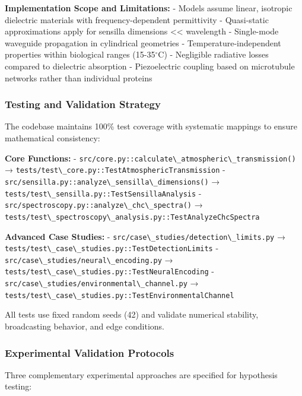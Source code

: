 \documentclass[
  13pt,
  a4paperpaper,
  12pt]{article}
\newcommand{\passthrough}[1]{#1}
\begin{document}
\textbf{Implementation Scope and Limitations:} - Models assume linear,
isotropic dielectric materials with frequency-dependent permittivity -
Quasi-static approximations apply for sensilla dimensions
\textless\textless{} wavelength - Single-mode waveguide propagation in
cylindrical geometries - Temperature-independent properties within
biological ranges (15-35\(^{\circ}\mathrm{C}\)) - Negligible radiative
losses compared to dielectric absorption - Piezoelectric coupling based
on microtubule networks rather than individual proteins

\subsubsection{Testing and Validation
Strategy}\label{testing-and-validation-strategy}

The codebase maintains 100\% test coverage with systematic mappings to
ensure mathematical consistency:

\textbf{Core Functions:} -
\passthrough{\lstinline!src/core.py::calculate\_atmospheric\_transmission()!}
→
\passthrough{\lstinline!tests/test\_core.py::TestAtmosphericTransmission!}
-
\passthrough{\lstinline!src/sensilla.py::analyze\_sensilla\_dimensions()!}
→
\passthrough{\lstinline!tests/test\_sensilla.py::TestSensillaAnalysis!}
- \passthrough{\lstinline!src/spectroscopy.py::analyze\_chc\_spectra()!}
→
\passthrough{\lstinline!tests/test\_spectroscopy\_analysis.py::TestAnalyzeChcSpectra!}

\textbf{Advanced Case Studies:} -
\passthrough{\lstinline!src/case\_studies/detection\_limits.py!} →
\passthrough{\lstinline!tests/test\_case\_studies.py::TestDetectionLimits!}
- \passthrough{\lstinline!src/case\_studies/neural\_encoding.py!} →
\passthrough{\lstinline!tests/test\_case\_studies.py::TestNeuralEncoding!}
- \passthrough{\lstinline!src/case\_studies/environmental\_channel.py!}
→
\passthrough{\lstinline!tests/test\_case\_studies.py::TestEnvironmentalChannel!}

All tests use fixed random seeds (42) and validate numerical stability,
broadcasting behavior, and edge conditions.

\subsubsection{Experimental Validation
Protocols}\label{experimental-validation-protocols}

Three complementary experimental approaches are specified for hypothesis
testing:
\end{document}

